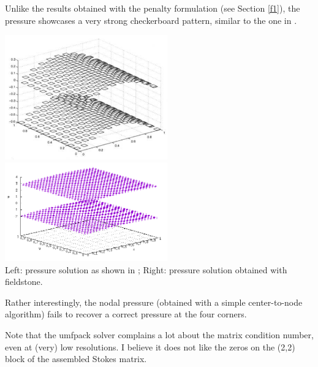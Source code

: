 Unlike the results obtained with the penalty formulation (see Section \ref{f1}),
the pressure showcases a very strong checkerboard pattern, similar to the one 
in \cite{dohu03}.

\begin{center}
\includegraphics[width=7cm]{python_codes/fieldstone_14/doneahuerta}
\includegraphics[width=7cm]{python_codes/fieldstone_14/mine}\\
Left: pressure solution as shown in \cite{dohu03}; Right: pressure solution obtained
with fieldstone.
\end{center}

Rather interestingly, the nodal pressure (obtained with a simple center-to-node algorithm)
fails to recover a correct pressure at the four corners.

Note that the umfpack solver complains a lot about the matrix condition number, 
even at (very) low resolutions. I believe it does not like the zeros on the (2,2)
block of the assembled Stokes matrix. 
